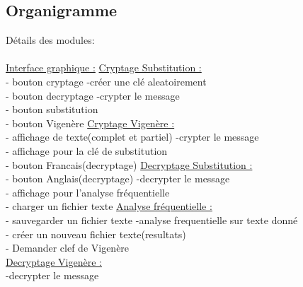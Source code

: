 \documentclass[a4]{article}
\begin{document}
		\subsection{Organigramme}
Détails des modules:\\ \\
		\underline{Interface graphique :}     \hspace{5cm}  \underline{Cryptage Substitution :}\\
			- bouton cryptage            \hspace{5.5cm}       -créer une clé aleatoirement\\
			- bouton decryptage         \hspace{5cm}        -crypter le message\\
			- bouton substitution\\
			- bouton Vigenère           \hspace{5.2cm}       \underline{Cryptage Vigenère :}\\
			- affichage de texte(complet et partiel)  \hspace{2.2cm} -crypter le message\\
			- affichage pour la clé de substitution\\
			- bouton Francais(decryptage)   \hspace{3.5cm}     \underline{Decryptage Substitution :}\\
			- bouton Anglais(decryptage)    \hspace{3.5cm}     -decrypter le message\\
			- affichage pour l'analyse fréquentielle\\
			- charger un fichier texte       \hspace{4.2cm}  \underline{Analyse fréquentielle :}\\
			- sauvegarder un fichier texte     \hspace{3.8cm}  -analyse frequentielle sur texte donné\\
			- créer un nouveau fichier texte(resultats)\\
			- Demander clef de Vigenère\\
			
		\underline{Decryptage Vigenère :}\\
			-decrypter le message
		
		
\end{document}
